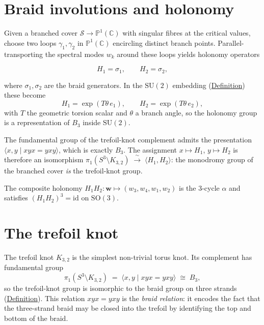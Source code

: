 \section{Braid involutions and holonomy}
\label{sec:braid-involutions}



\begin{remark}
  \label{rem:holonomy-trefoil}
Given a branched cover $\mathcal{S}\to\mathbb{P}^1(\mathbb{C})$ with singular fibres
at the critical values, choose two loops
$\gamma_1,\gamma_2$ in $\mathbb{P}^1(\mathbb{C})$ encircling distinct branch
points.  Parallel-transporting the spectral modes $w_k$ around these
loops yields holonomy operators

\begin{equation}\label{eq:holonomy-generators}
  H_1=\sigma_1,\qquad H_2=\sigma_2,
\end{equation}

where $\sigma_1,\sigma_2$ are the braid generators.
In the $\mathrm{SU}(2)$ embedding (\hyperref[def:su2-generators]{Definition}) these
become
\[
H_1=\exp(T\theta\,e_1),\qquad H_2=\exp(T\theta\,e_2),
\]
with $T$ the geometric torsion scalar and $\theta$ a branch angle, so
the holonomy group is a representation of $B_3$ inside
$\mathrm{SU}(2)$.

The fundamental group of the trefoil-knot complement admits the
presentation $\langle x,y\mid xyx=yxy\rangle$, which is exactly
$B_3$.  The assignment
$x\mapsto H_1$, $y\mapsto H_2$ is therefore an isomorphism
$\pi_1(S^3\setminus K_{3,2})\;\xrightarrow{\;\sim\;}\;
\langle H_1,H_2\rangle$: the monodromy group of the branched cover
\emph{is} the trefoil-knot group.

The composite holonomy
$H_1 H_2\colon\mathbf{w}\mapsto(w_3,w_4,w_1,w_2)$ is the
$3$-cycle $\alpha$ and satisfies
$(H_1 H_2)^3=\mathrm{id}$ on $\mathrm{SO}(3)$.
\end{remark}

\section{The trefoil knot}
\label{sec:trefoil-knot}



\begin{remark}
  \label{rem:trefoil-knot-group}
The trefoil knot $K_{3,2}$ is the simplest non-trivial torus knot.  Its
complement has fundamental group
\[
\pi_1(S^3\setminus K_{3,2})
  \;=\;\langle x,y\mid xyx=yxy\rangle
  \;\cong\;B_3,
\]
so the trefoil-knot group is isomorphic to the braid group on three
strands (\hyperref[def:braid-group]{Definition}).  This relation $xyx=yxy$ is
the \emph{braid relation}: it encodes the fact that the three-strand
braid may be closed into the trefoil by identifying the top and bottom of
the braid.
\end{remark}


